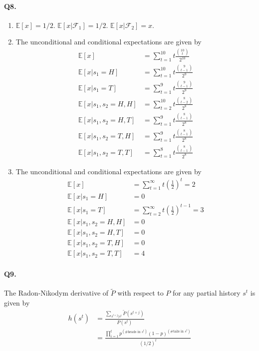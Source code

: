 \documentclass[11pt]{article}
\theoremstyle{definition}
\theoremstyle{boldtitle} %
\numberwithin{equation}{section}
\numberwithin{figure}{section}
\numberwithin{table}{section}
\begin{document}
\paragraph{Q8.}
\begin{enumerate}
    \item $\mathbb{E}[x] = 1/2$. $\mathbb{E}[x| \mathcal{F}_1] = 1/2$. $\mathbb{E}[x| \mathcal{F}_2] = x$.
    \item The unconditional and conditional expectations are given by 
    \begin{align*}
        \mathbb{E}[x] & = \sum_{t=1}^{10} t \frac{\binom{10}{t} }{2^{10}} \\
        \mathbb{E}[x | s_1 = H ] & = \sum_{t=1}^{10} t \frac{\binom{9}{t-1} }{2^{9}}  \\
        \mathbb{E}[x | s_1 = T ] & = \sum_{t=1}^{9} t \frac{\binom{9}{t-1} }{2^{9}}  \\ 
        \mathbb{E}[x | s_1, s_2 = H, H] & = \sum_{t=2}^{10} t \frac{\binom{8}{t-2} }{2^8}  \\
        \mathbb{E}[x | s_1, s_2 = H, T ] & = \sum_{t=1}^{9} t \frac{\binom{8}{t-1} }{2^8}   \\
        \mathbb{E}[x | s_1, s_2 = T, H ] & = \sum_{t=1}^{9} t \frac{\binom{8}{t-1} }{2^8}   \\
        \mathbb{E}[x | s_1, s_2 = T, T ] & = \sum_{t=1}^{8} t \frac{\binom{8}{t-1} }{2^8}  
    \end{align*}
    \item The unconditional and conditional expectations are given by 
    \begin{align*}
        \mathbb{E}[x] & = \sum_{t=1}^{\infty} t \left(\frac{1}{2}\right)^t = 2 \\
        \mathbb{E}[x | s_1 = H ] & = 0  \\
        \mathbb{E}[x | s_1 = T ] & = \sum_{t=2}^{\infty} t \left(\frac{1}{2}\right)^{t-1} = 3   \\ 
        \mathbb{E}[x | s_1, s_2 = H, H ] & = 0 \\
        \mathbb{E}[x | s_1, s_2 = H, T ] & = 0 \\
        \mathbb{E}[x | s_1, s_2 = T, H] & = 0 \\
        \mathbb{E}[x | s_1, s_2 = T, T] & = 4
        \end{align*}
\end{enumerate}

\paragraph{Q9.}
The Radon-Nikodym derivative of $\tilde{P}$ with respect to $P$ for any partial history $s^t$ is given by 
\begin{align*}
h(s^t) & = \frac{\sum_{s^{t+j}| s^t} \tilde{P}(s^{t+j})}{P(s^{t})} \\ 
    & = \frac{\prod_{i=1}^{t} p^{(\#\text{heads in }s^t)} (1 - p)^{(\#\text{tails in }s^t)}}{(1/2)^t}
\end{align*}
\end{document}
